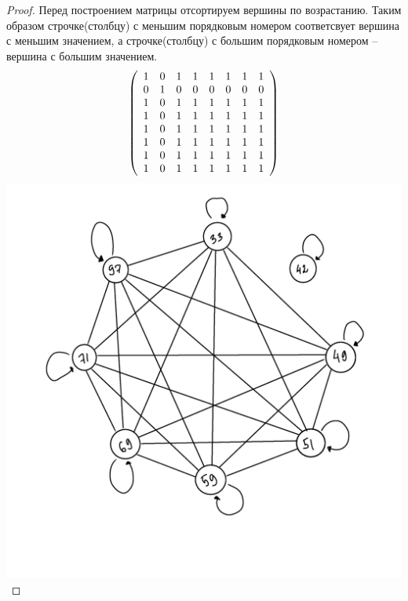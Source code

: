 \begin{proof}
Перед построением матрицы отсортируем вершины по возрастанию. Таким образом строчке(столбцу) с меньшим порядковым номером соответсвует вершина с меньшим значением, а строчке(столбцу) с большим порядковым номером -- вершина с большим значением.
	$$ \left( \begin{array}{c c c c c c c c } 
 
 1 & 0 & 1 & 1 & 1 & 1 & 1 & 1 \\ 

 0 & 1 & 0 & 0 & 0 & 0 & 0 & 0 \\

 1 & 0 & 1 & 1 & 1 & 1 & 1 & 1 \\ 
 
 1 & 0 & 1 & 1 & 1 & 1 & 1 & 1 \\ 
 
 1 & 0 & 1 & 1 & 1 & 1 & 1 & 1 \\ 
 
 1 & 0 & 1 & 1 & 1 & 1 & 1 & 1 \\ 
 
 1 & 0 & 1 & 1 & 1 & 1 & 1 & 1 \\ 
 
 1 & 0 & 1 & 1 & 1 & 1 & 1 & 1  \end {array} \right) $$
 \includegraphics{граф4.png}
\end{proof}

